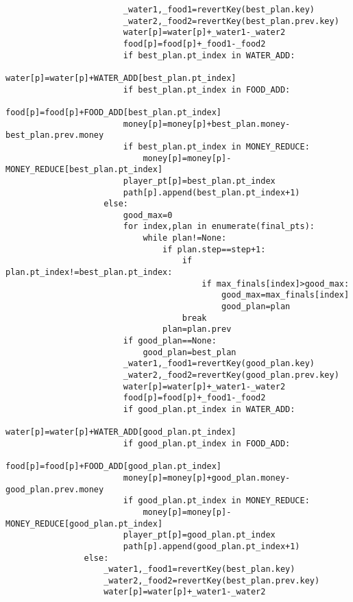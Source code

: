 \documentclass[bwprint]{cumcmthesis} %
\begin{document}
\begin{appendices}
\begin{lstlisting}
                        _water1,_food1=revertKey(best_plan.key)
                        _water2,_food2=revertKey(best_plan.prev.key)
                        water[p]=water[p]+_water1-_water2
                        food[p]=food[p]+_food1-_food2
                        if best_plan.pt_index in WATER_ADD:
                            water[p]=water[p]+WATER_ADD[best_plan.pt_index]
                        if best_plan.pt_index in FOOD_ADD:
                            food[p]=food[p]+FOOD_ADD[best_plan.pt_index]                    
                        money[p]=money[p]+best_plan.money-best_plan.prev.money
                        if best_plan.pt_index in MONEY_REDUCE:
                            money[p]=money[p]-MONEY_REDUCE[best_plan.pt_index]
                        player_pt[p]=best_plan.pt_index
                        path[p].append(best_plan.pt_index+1)
                    else:
                        good_max=0
                        for index,plan in enumerate(final_pts):
                            while plan!=None:
                                if plan.step==step+1:
                                    if plan.pt_index!=best_plan.pt_index:
                                        if max_finals[index]>good_max:
                                            good_max=max_finals[index]
                                            good_plan=plan
                                    break
                                plan=plan.prev
                        if good_plan==None:
                            good_plan=best_plan
                        _water1,_food1=revertKey(good_plan.key)
                        _water2,_food2=revertKey(good_plan.prev.key)
                        water[p]=water[p]+_water1-_water2
                        food[p]=food[p]+_food1-_food2
                        if good_plan.pt_index in WATER_ADD:
                            water[p]=water[p]+WATER_ADD[good_plan.pt_index]
                        if good_plan.pt_index in FOOD_ADD:
                            food[p]=food[p]+FOOD_ADD[good_plan.pt_index]
                        money[p]=money[p]+good_plan.money-good_plan.prev.money
                        if good_plan.pt_index in MONEY_REDUCE:
                            money[p]=money[p]-MONEY_REDUCE[good_plan.pt_index]
                        player_pt[p]=good_plan.pt_index
                        path[p].append(good_plan.pt_index+1)
                else:
                    _water1,_food1=revertKey(best_plan.key)
                    _water2,_food2=revertKey(best_plan.prev.key)
                    water[p]=water[p]+_water1-_water2

\end{lstlisting}
\end{appendices}
\end{document}
